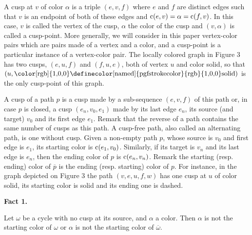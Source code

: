 \documentclass[10pt,a4paper]{amsart}
\begin{document}
 
 
A cusp at $v$ of color $\alpha$ is a triple $(e,v,f)$ where $e$ and $f$ are distinct edges such that $v$ is an endpoint of both of these edges and $\textnormal{{c}}(e,v)=\alpha=\textnormal{{c}}(f,v)$. In this case, $v$ is called the vertex of the cusp, $\alpha$ the color of the cusp and $(v,\alpha)$ is called a cusp-point. More generally, we will consider in this paper vertex-color pairs which are pairs made of a vertex and a color, and a cusp-point is a particular instance of a vertex-color pair. The locally colored graph in Figure 3 has two cusps, $(e,u,f)$ and $(f,u,e)$, both of vertex $u$ and color solid, so that $(u,\text{{\color[rgb]{1,0,0}\definecolor[named]{pgfstrokecolor}{rgb}{1,0,0}%
solid}})$ is the only cusp-point of this graph.\par
 
 
 
A cusp of a path $p$ is a cusp made by a sub-sequence $(e,v,f)$ of this path or, in case $p$ is closed, a cusp $(e_{n},v_{0},e_{1})$ made by its last edge $e_{n}$, its source (and target) $v_{0}$ and its first edge $e_{1}$. Remark that the reverse of a path contains the same number of cusps as this path. A cusp-free path, also called an alternating path, is one without cusp. Given a non-empty path $p$, whose source is $v_{0}$ and first edge is $e_{1}$, its starting color is $\textnormal{{c}}(e_{1},v_{0})$. Similarly, if its target is $v_{n}$ and its last edge is $e_{n}$, then the ending color of $p$ is $\textnormal{{c}}(e_{n},v_{n})$. Remark the starting (resp. ending) color of $\overline{p}$ is the ending (resp. starting) color of $p$. For instance, in the graph depicted on Figure 3 the path $(v,e,u,f,w)$ has one cusp at $u$ of color solid, its starting color is solid and its ending one is dashed.\par
 
 
 
\par\medskip\noindent\textbf{Fact 1.}\par
 
 
Let $\omega$ be a cycle with no cusp at its source, and $\alpha$ a color. Then $\alpha$ is not the starting color of $\omega$ or $\alpha$ is not the starting color of $\overline{\omega}$.\par
 
\end{document}
